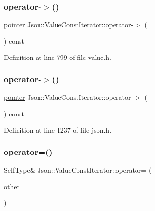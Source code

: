 \subsubsection{\texorpdfstring{operator-\/$>$()}{operator->()}\hspace{0.1cm}{\footnotesize\ttfamily [1/2]}}
{\footnotesize\ttfamily \hyperlink{class_json_1_1_value_const_iterator_a400136bd8bc09e9fddec0785fa2cff14}{pointer} Json\+::\+Value\+Const\+Iterator\+::operator-\/$>$ (\begin{DoxyParamCaption}{ }\end{DoxyParamCaption}) const\hspace{0.3cm}{\ttfamily [inline]}}



Definition at line 799 of file value.\+h.

\hypertarget{class_json_1_1_value_const_iterator_a3c608ae53c192ee846eb265bae1cfeec}{}\label{class_json_1_1_value_const_iterator_a3c608ae53c192ee846eb265bae1cfeec} 
\subsubsection{\texorpdfstring{operator-\/$>$()}{operator->()}\hspace{0.1cm}{\footnotesize\ttfamily [2/2]}}
{\footnotesize\ttfamily \hyperlink{class_json_1_1_value_const_iterator_a400136bd8bc09e9fddec0785fa2cff14}{pointer} Json\+::\+Value\+Const\+Iterator\+::operator-\/$>$ (\begin{DoxyParamCaption}{ }\end{DoxyParamCaption}) const\hspace{0.3cm}{\ttfamily [inline]}}



Definition at line 1237 of file json.\+h.

\hypertarget{class_json_1_1_value_const_iterator_afca9f2ee621a4a47f3e61d6144ce3d0c}{}\label{class_json_1_1_value_const_iterator_afca9f2ee621a4a47f3e61d6144ce3d0c} 
\subsubsection{\texorpdfstring{operator=()}{operator=()}\hspace{0.1cm}{\footnotesize\ttfamily [1/2]}}
{\footnotesize\ttfamily \hyperlink{class_json_1_1_value_iterator_base_a9d2a940d03ea06d20d972f41a89149ee}{Self\+Type}\& Json\+::\+Value\+Const\+Iterator\+::operator= (\begin{DoxyParamCaption}\item[{const \hyperlink{class_json_1_1_value_iterator_base}{Value\+Iterator\+Base} \&}]{other }\end{DoxyParamCaption})}

